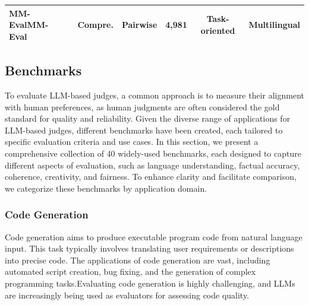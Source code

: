 \begin{table}[ht]
\begin{tabular}{lccccc}
\rowcolor{mygray}
MM-EvalMM-Eval~\cite{son2024mm}             & Compre.         & Pairwise                                                                & 4,981        & Task-oriented                                                                                                              & Multilingual                                              \\ \hline
\end{tabular}
\end{table}




\subsection{Benchmarks}
\label{sec:benchmarks}
To evaluate LLM-based judges, a common approach is to measure their alignment with human preferences, as human judgments are often considered the gold standard for quality and reliability. Given the diverse range of applications for LLM-based judges, different benchmarks have been created, each tailored to specific evaluation criteria and use cases.
In this section, we present a comprehensive collection of 40 widely-used benchmarks, each designed to capture different aspects of evaluation, such as language understanding, factual accuracy, coherence, creativity, and fairness. To enhance clarity and facilitate comparison, we categorize these benchmarks by application domain.

\subsubsection{Code Generation}
\label{sec:Code Generation}
Code generation aims to produce executable program code from natural language input. This task typically involves translating user requirements or descriptions into precise code. The applications of code generation are vast, including automated script creation, bug fixing, and the generation of complex programming tasks.Evaluating code generation is highly challenging, and LLMs are increasingly being used as evaluators for assessing code quality.


